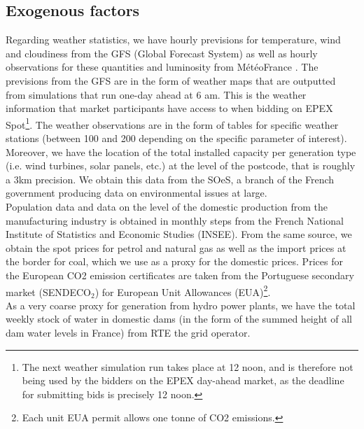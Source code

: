 \subsection*{Exogenous factors}

Regarding weather statistics, we have hourly previsions for temperature, wind and cloudiness from the GFS (Global Forecast System) as well as hourly observations for these quantities and luminosity from M\'{e}t\'{e}oFrance
. The previsions from the GFS are in the form of weather maps that are outputted from simulations that run one-day ahead at 6 am. This is the weather information that market participants have access to when bidding on EPEX Spot\footnote{The next weather simulation run takes place at 12 noon, and is therefore not being used by the bidders on the EPEX day-ahead market, as the deadline for submitting bids is precisely 12 noon.}. The weather observations are in the form of tables for specific weather stations (between 100 and 200 depending on the specific parameter of interest).\\

Moreover, we have the location of the total installed capacity per generation type (i.e. wind turbines, solar panels, etc.) at the level of the postcode, that is roughly a 3km precision. We obtain this data from the SOeS, a branch of the French government producing data on environmental issues at large. \\

Population data and data on the level of the domestic production from the manufacturing industry is obtained in monthly steps from the French National Institute of Statistics and Economic Studies (INSEE). From the same source, we obtain the spot prices for petrol and natural gas as well as the import prices at the border for coal, which we use as a proxy for the domestic prices. 
Prices for the European CO2 emission certificates are taken from the Portuguese secondary market (SENDECO$_2$) for European Unit Allowances (EUA)\footnote{Each unit EUA permit allows one tonne of CO2 emissions.}.\\

As a very coarse proxy for generation from hydro power plants, we have the total weekly stock of water in domestic dams (in the form of the summed height of all dam water levels in France) from RTE the grid operator.


